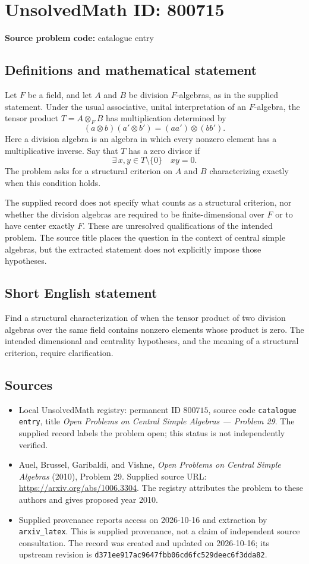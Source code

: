\documentclass[11pt]{article}
\begin{document}
\section*{UnsolvedMath ID: 800715}
\textbf{Source problem code:} catalogue entry
\subsection{Definitions and mathematical statement}
Let \(F\) be a field, and let \(A\) and \(B\) be division \(F\)-algebras, as in the supplied statement. Under the usual associative, unital interpretation of an \(F\)-algebra, the tensor product \(T=A\otimes_F B\) has multiplication determined by
\[
(a\otimes b)(a'\otimes b')=(aa')\otimes(bb').
\]
Here a division algebra is an algebra in which every nonzero element has a multiplicative inverse. Say that \(T\) has a zero divisor if
\[
\exists\,x,y\in T\setminus\{0\}\quad xy=0.
\]
The problem asks for a structural criterion on \(A\) and \(B\) characterizing exactly when this condition holds.

The supplied record does not specify what counts as a structural criterion, nor whether the division algebras are required to be finite-dimensional over \(F\) or to have center exactly \(F\). These are unresolved qualifications of the intended problem. The source title places the question in the context of central simple algebras, but the extracted statement does not explicitly impose those hypotheses.
\subsection{Short English statement}
Find a structural characterization of when the tensor product of two division algebras over the same field contains nonzero elements whose product is zero. The intended dimensional and centrality hypotheses, and the meaning of a structural criterion, require clarification.
\subsection{Sources}
\begin{itemize}
\item Local UnsolvedMath registry: permanent ID \(800715\), source code \texttt{catalogue entry}, title \emph{Open Problems on Central Simple Algebras --- Problem 29}. The supplied record labels the problem open; this status is not independently verified.
\item Auel, Brussel, Garibaldi, and Vishne, \emph{Open Problems on Central Simple Algebras} (2010), Problem 29. Supplied source URL: \url{https://arxiv.org/abs/1006.3304}. The registry attributes the problem to these authors and gives proposed year 2010.
\item Supplied provenance reports access on 2026-10-16 and extraction by \texttt{arxiv\_latex}. This is supplied provenance, not a claim of independent source consultation. The record was created and updated on 2026-10-16; its upstream revision is \texttt{d371ee917ac9647fbb06cd6fc529deec6f3dda82}.
\end{itemize}
\end{document}
